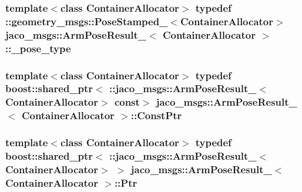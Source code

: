 \subsubsection[{\texorpdfstring{\+\_\+pose\+\_\+type}{_pose_type}}]{\setlength{\rightskip}{0pt plus 5cm}template$<$class Container\+Allocator$>$ typedef \+::geometry\+\_\+msgs\+::\+Pose\+Stamped\+\_\+$<$Container\+Allocator$>$ {\bf jaco\+\_\+msgs\+::\+Arm\+Pose\+Result\+\_\+}$<$ Container\+Allocator $>$\+::{\bf \+\_\+pose\+\_\+type}}\hypertarget{structjaco__msgs_1_1ArmPoseResult___a498b066ab7353819251e9a9ca39142bb}{}\label{structjaco__msgs_1_1ArmPoseResult___a498b066ab7353819251e9a9ca39142bb}
\subsubsection[{\texorpdfstring{Const\+Ptr}{ConstPtr}}]{\setlength{\rightskip}{0pt plus 5cm}template$<$class Container\+Allocator$>$ typedef boost\+::shared\+\_\+ptr$<$ \+::{\bf jaco\+\_\+msgs\+::\+Arm\+Pose\+Result\+\_\+}$<$Container\+Allocator$>$ const$>$ {\bf jaco\+\_\+msgs\+::\+Arm\+Pose\+Result\+\_\+}$<$ Container\+Allocator $>$\+::{\bf Const\+Ptr}}\hypertarget{structjaco__msgs_1_1ArmPoseResult___a1352fbeed485be056735521eb006f518}{}\label{structjaco__msgs_1_1ArmPoseResult___a1352fbeed485be056735521eb006f518}
\subsubsection[{\texorpdfstring{Ptr}{Ptr}}]{\setlength{\rightskip}{0pt plus 5cm}template$<$class Container\+Allocator$>$ typedef boost\+::shared\+\_\+ptr$<$ \+::{\bf jaco\+\_\+msgs\+::\+Arm\+Pose\+Result\+\_\+}$<$Container\+Allocator$>$ $>$ {\bf jaco\+\_\+msgs\+::\+Arm\+Pose\+Result\+\_\+}$<$ Container\+Allocator $>$\+::{\bf Ptr}}\hypertarget{structjaco__msgs_1_1ArmPoseResult___a1a6d5659d134ca48216daf4156ba4fdb}{}\label{structjaco__msgs_1_1ArmPoseResult___a1a6d5659d134ca48216daf4156ba4fdb}
